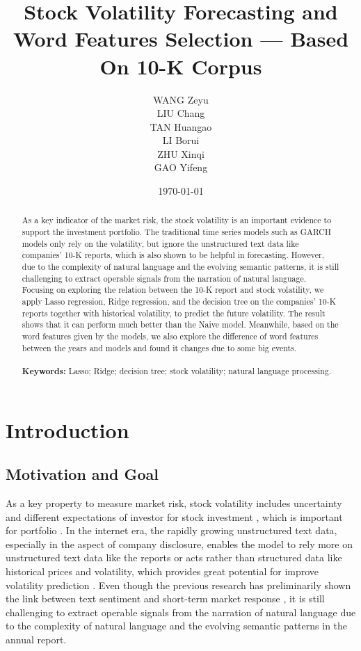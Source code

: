 \documentclass[11pt]{article}
\title{\vspace{-1.5cm} \huge Stock Volatility Forecasting and Word Features Selection --- Based On 10-K Corpus}
\author{
  \parbox{0.3\textwidth}{
    \centering WANG Zeyu
    \vspace{.25cm}
  }
  \parbox{0.3\textwidth}{
    \centering LIU Chang
    \vspace{.25cm}
  }
  \parbox{0.3\textwidth}{
    \centering TAN Huangao
    \vspace{.25cm}
  }
  \parbox{0.3\textwidth}{
    \centering LI Borui
  }
  \parbox{0.3\textwidth}{
    \centering ZHU Xinqi
  }
  \parbox{0.3\textwidth}{
    \centering GAO Yifeng
  }
}
\date{\today}
\begin{document}
\maketitle
\thispagestyle{empty}
\setcounter{page}{0}

\begin{abstract}
  As a key indicator of the market risk, the stock volatility is an important evidence to support the investment portfolio. The traditional time series models such as GARCH models only rely on the volatility, but ignore the unstructured text data like companies' 10-K reports, which is also shown to be helpful in forecasting. However, due to the complexity of natural language and the evolving semantic patterns, it is still challenging to extract operable signals from the narration of natural language. Focusing on exploring the relation between the 10-K report and stock volatility, we apply Lasso regression, Ridge regression, and the decision tree on the companies' 10-K reports together with historical volatility, to predict the future volatility. The result shows that it can perform much better than the Naive model. Meanwhile, based on the word features given by the models, we also explore the difference of word features between the years and models and found it changes due to some big events.
  \\\\
  \textbf{Keywords:} Lasso; Ridge; decision tree; stock volatility; natural language processing.
\end{abstract}

\newpage

\section{Introduction}

\subsection{Motivation and Goal}

As a key property to measure market risk, stock volatility includes uncertainty and different expectations of investor for stock investment \cite{RePEc:eee:finlet:v:69:y:2024:i:pb:s1544612324011929}, which is important for portfolio \cite{ta2020portfolio}. In the internet era, the rapidly growing unstructured text data, especially in the aspect of company disclosure, enables the model to rely more on unstructured text data like the reports or acts \cite{RAJENDRAN2024101813} rather than structured data like historical prices and volatility, which provides great potential for improve volatility prediction \cite{Ma2024} . Even though the previous research has preliminarily shown the link between text sentiment and short-term market response \cite{li2022sentiment}, it is still challenging to extract operable signals from the narration of natural language due to the complexity of natural language and the evolving semantic patterns in the annual report.
\end{document}
